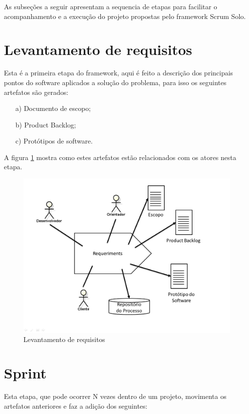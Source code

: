 As subseções a seguir apresentam a sequencia de etapas para facilitar o acompanhamento e a execução do projeto propostas pelo framework Scrum Solo.

\section{Levantamento de requisitos}
Esta é a primeira etapa do framework, aqui é feito a descrição dos principais pontos do software aplicados a solução do problema, para isso os seguintes artefatos são gerados:

\begin{itemize}
    \item[a)] Documento de escopo;
    \item[b)] Product Backlog;
    \item[c)] Protótipos de software.
\end{itemize}

A figura \ref{sprints} mostra como estes artefatos estão relacionados com os atores nesta etapa.

\begin{figure}[H]
\caption{\label{sprints} Levantamento de requisitos}
\includegraphics[scale=0.33]{img/levantamento-requisitos.jpg}
\end{figure}

\section{Sprint}
Esta etapa, que pode ocorrer N vezes dentro de um projeto, movimenta os artefatos anteriores e faz a adição dos seguintes:

